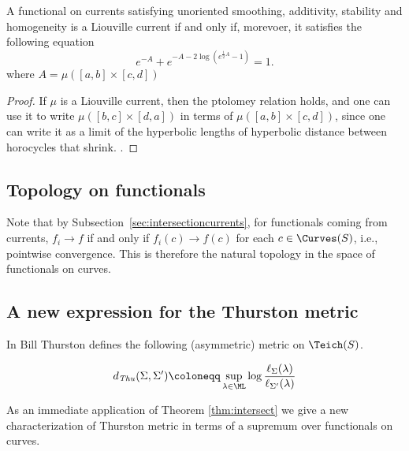 \begin{proposition}
A functional on currents satisfying unoriented smoothing, additivity, stability and homogeneity is a Liouville current if and only if, morevoer, it satisfies the following equation
\[
  e^{-A} + e^{-A-2\log\left(e^{\frac{1}{2}A}-1\right)}=1.
\]
where $A=\mu([a,b] \times [c,d])$
\end{proposition}
\begin{proof}
If $\mu$ is a Liouville current, then the ptolomey relation holds, and one can use it to write
$\mu([b,c] \times [d,a])$ in terms of $\mu([a,b] \times [c,d])$, since one can write it as a limit of the hyperbolic lengths of hyperbolic distance between horocycles that shrink.
.
\end{proof}

\subsection{Topology on functionals}

Note that by Subsection~\ref{sec:intersectioncurrents}, for functionals coming from currents, $f_i \to f$ if and only if $f_i(c) \to f(c)$ for each $c \in \Curves(S)$, i.e., pointwise convergence.
This is therefore the natural topology in the space of functionals on curves.

\subsection{A new expression for the Thurston metric}


In \cite[Theorem~8.5]{Thu98:MinimalStretch} Bill Thurston defines the following (asymmetric) metric on $\Teich(S)$.

\[
d_{\mathit{Thu}}(\Sigma,\Sigma') \coloneqq \sup_{\lambda \in \ML}\log \frac{\ell_{\Sigma}(\lambda)}{\ell_{\Sigma'}(\lambda)}
\]

As an immediate application of Theorem \ref{thm:intersect} we give a new characterization of Thurston metric in terms of a supremum over functionals on curves.

